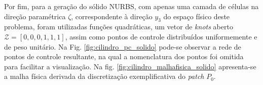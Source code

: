 \documentclass[tese_patricia]{subfiles}
\begin{document}
Por fim, para a geração do sólido NURBS, com apenas uma camada de células na direção paramétrica $\zeta$, correspondente à direção $y_3$ do espaço físico deste problema, foram utilizadas funções quadráticas, um vetor de \textit{knots} aberto $\mathcal{Z} = \left[0,0,0,1,1,1\right]$, assim como pontos de controle distribuídos uniformemente e de peso unitário. Na Fig. \ref{fig:cilindro_pc_solido} pode-se observar a rede de pontos de controle resultante, na qual a nomenclatura dos pontos foi omitida para facilitar a visualização. Na fig. \ref{fig:cilindro_malhafisica_solido} apresenta-se a malha física derivada da discretização exemplificativa do \textit{patch} $P_0$.

\begin{figure}[!t]
	\centering
	   \ \ 

\end{figure}
\end{document}
